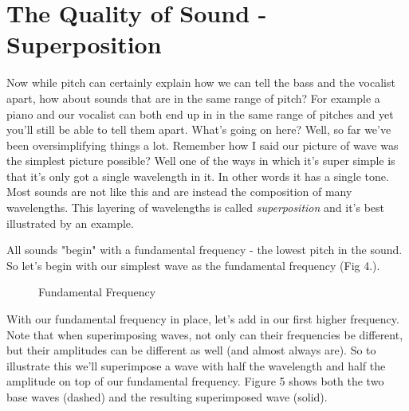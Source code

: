 \documentclass[12pt,a6paper]{book}
\begin{document}
\section{The Quality of Sound - Superposition}
Now while pitch can certainly explain how we can tell the bass and the vocalist apart, how about sounds that are in the same range of pitch? For example a piano and our vocalist can both end up in in the same range of pitches and yet you'll still be able to tell them apart. What's going on here? Well, so far we've been oversimplifying things a lot. Remember how I said our picture of wave was the simplest picture possible? Well one of the ways in which it's super simple is that it's only got a single wavelength in it. In other words it has a single tone. Most sounds are not like this and are instead the composition of many wavelengths. This layering of wavelengths is called \textit{superposition} and it's best illustrated by an example. 

All sounds "begin" with a fundamental frequency - the lowest pitch in the sound. So let's begin with our simplest wave as the fundamental frequency (Fig 4.).

\begin{figure}[!htb]
\caption{\label{fig:my-label} Fundamental Frequency}
\end{figure}

With our fundamental frequency in place, let's add in our first higher frequency. Note that when superimposing waves, not only can their frequencies be different, but their amplitudes can be different as well (and almost always are). So to illustrate this we'll superimpose a wave with half the wavelength and half the amplitude on top of our fundamental frequency. Figure 5 shows both the two base waves (dashed) and the resulting superimposed wave (solid).
\end{document}
